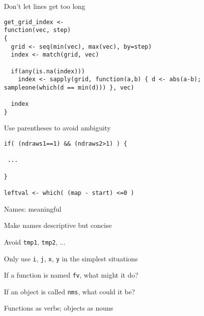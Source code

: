 \documentclass[12pt,t]{beamer}
\begin{document}
\begin{frame}[fragile,c]{Don't let lines get too long}

\begin{lstlisting}
get_grid_index <-
function(vec, step)
{
  grid <- seq(min(vec), max(vec), by=step)
  index <- match(grid, vec)

  if(any(is.na(index)))
    index <- sapply(grid, function(a,b) { d <- abs(a-b); sampleone(which(d == min(d))) }, vec)

  index
}
\end{lstlisting}


\end{frame}


\begin{frame}[fragile,c]{Use parentheses to avoid ambiguity}


\begin{lstlisting}
if( (ndraws1==1) && (ndraws2>1) ) {

 ...

}

leftval <- which( (map - start) <=0 )
\end{lstlisting}


\end{frame}




\begin{frame}{Names: meaningful}

\bbi
\item Make names descriptive but concise
\item Avoid {\tt tmp1}, {\tt tmp2}, ...
\item Only use {\tt i}, {\tt j}, {\tt x}, {\tt y} in the simplest
  situations
\item If a function is named {\tt fv}, what might it do?
\item If an object is called {\tt nms}, what could it be?
\item Functions as verbs; objects as nouns
\ei

\end{frame}
\end{document}
